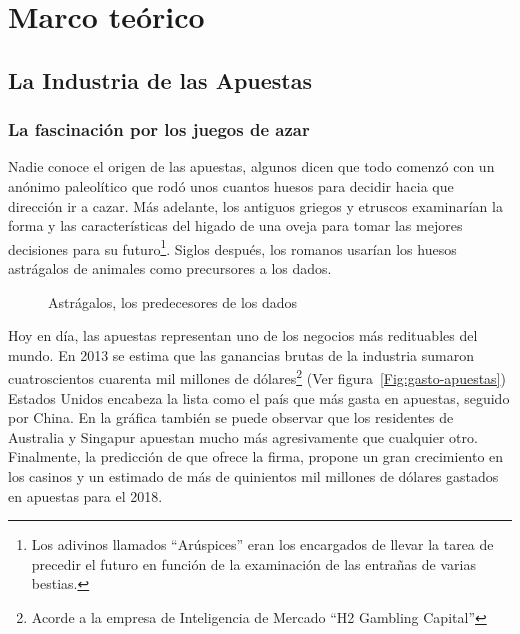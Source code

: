 \graphicspath{{/Users/brunomedina/Dropbox/Tesis-Egobets/egobets-notas/resources/marco/}}
\chapter{Marco teórico}
\section{La Industria de las Apuestas}
\subsection{La fascinación por los juegos de azar}

Nadie conoce el origen de las apuestas, algunos dicen que todo comenzó con un anónimo paleolítico que rodó unos cuantos huesos para decidir hacia que dirección ir a cazar. Más adelante, los antiguos griegos y etruscos examinarían la forma y  las características del higado de una oveja para tomar las mejores decisiones para su futuro\footnote{Los adivinos llamados ``Arúspices'' eran los encargados de llevar la tarea de precedir el futuro en función de la examinación de las entrañas de varias bestias.}. Siglos después, los romanos usarían los huesos astrágalos de animales como precursores a los dados.\cite{schwartz2013roll}

\begin{figure}[!htb]\centering
   \begin {minipage}{0.85\textwidth}
     \caption{Astrágalos, los predecesores de los dados}\label{Fig:huesos}
   \end{minipage}
\end{figure}

Hoy en día, las apuestas representan uno de los negocios más redituables del mundo. En 2013 se estima que las ganancias brutas de la industria sumaron cuatroscientos cuarenta mil millones de dólares\footnote{Acorde a la empresa de Inteligencia de Mercado ``H2 Gambling Capital''\cite{economistHouseWins}} (Ver figura~\ref{Fig:gasto-apuestas}) Estados Unidos encabeza la lista como el país que más gasta en apuestas, seguido por China. En la gráfica también se puede observar que los residentes de Australia y Singapur apuestan mucho más agresivamente que cualquier otro. Finalmente, la predicción de que ofrece la firma, propone un gran crecimiento en los casinos y un estimado de más de quinientos mil millones de dólares gastados en apuestas para el 2018.


